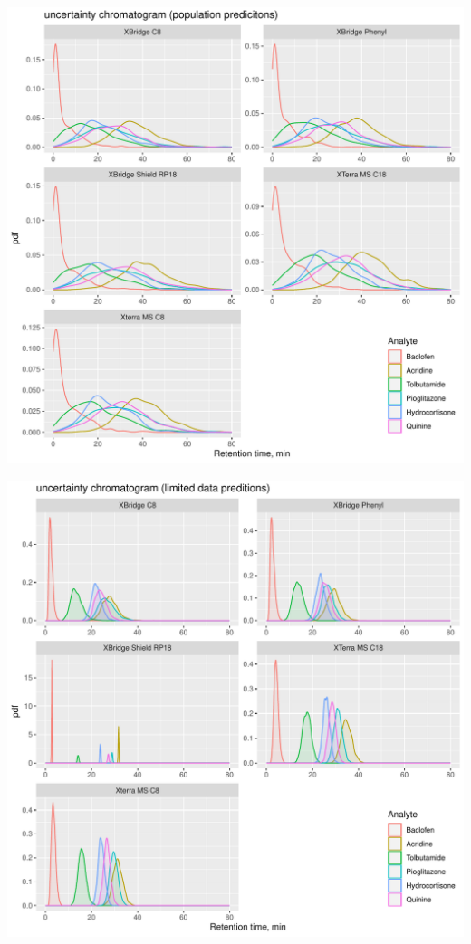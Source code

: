 \documentclass[
]{article}
\begin{document}
\includegraphics{../figures/concordanceplots/uncertainitychromatogram.population.pdf}

\newpage{}

\includegraphics{../figures/casestudy2/concordanceplots/chromatogram.pdf}
\end{document}
